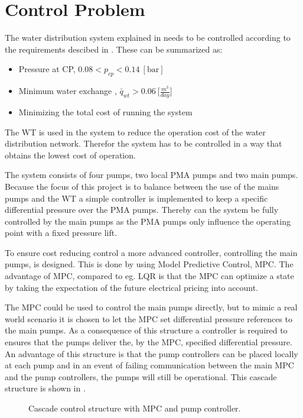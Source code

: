 \section{Control Problem}
\label{control_problem}

The water distribution system explained in  needs to be controlled according to the requirements descibed in . These can be summarized as: 

\begin{itemize}
	\item Pressure at CP, $0.08 < p_{cp} < 0.14 \:[\text{bar}]$
%
	\item Minimum water exchange , $\bar{q}_{wt} > 0.06 \: \big[\frac{m^3}{day}\big]$
%
	\item Minimizing the total cost of running the system
\end{itemize}

The WT is used in the system to reduce the operation cost of the water distribution network. Therefor the system has to be controlled in a way that obtains the lowest cost of operation. 

The system consists of four pumps, two local PMA pumps and two main pumps. Because the focus of this project is to balance between the use of the mains pumps and the WT a simple controller is implemented to keep a specific differential pressure over the PMA pumps. Thereby can the system be fully controlled by the main pumps as the PMA pumps only influence the operating point with a fixed pressure lift.

To ensure cost reducing control a more advanced controller, controlling the main pumps, is designed. This is done by using Model Predictive Control, MPC. The advantage of MPC, compared to eg. LQR is that the MPC can optimize a state by taking the expectation of the future electrical pricing into account. 

The MPC could be used to control the main pumps directly, but to mimic a real world scenario it is chosen to let the MPC set differential pressure references to the main pumps. As a consequence of this structure a controller is required to ensures that the pumps deliver the, by the MPC, specified differential pressure. An advantage of this structure is that the pump controllers can be placed locally at each pump and in an event of failing communication between the main MPC and the pump controllers, the pumps will still be operational. 
This cascade structure is shown in .  
\begin{figure}[H]
\centering
 
\caption{Cascade control structure with MPC and pump controller.}
\label{fig:control_structure}
\end{figure}

